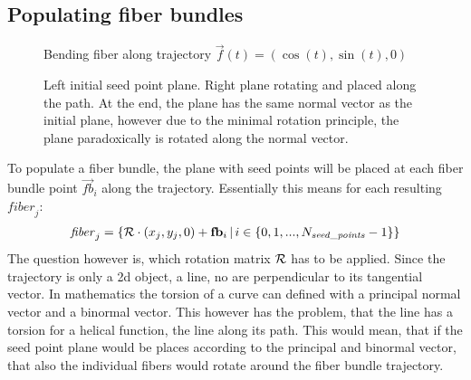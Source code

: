 \subsection{Populating fiber bundles}\label{sec:fillBundle}
%
\begin{figure}[!t]
    \centering
	\caption[Bending filled fiber bundle]{Bending fiber along trajectory $\vec{f}(t) = \left(\cos(t), \sin(t), 0 \right)$ }
	\label{fig:bendingFiberBundle}
\end{figure}
%
\begin{figure}[!t]
    \centering
    \setlength{\tikzwidth}{0.75\textwidth}
	\caption[]{Left initial seed point plane. Right plane rotating and placed along the path. At the end, the plane has the same normal vector as the initial plane, however due to the minimal rotation principle, the plane paradoxically is rotated along the normal vector.}
	\label{fig:torsion}
\end{figure}
%
To populate a fiber bundle, the plane with seed points will be placed at each fiber bundle point $\vec{fb}_i$ along the trajectory.
Essentially this means for each resulting $\mathit{fiber}_j$:
\begin{align}
    \mathit{fiber}_j = \left\{ \mathcal{R} \cdot (x_j, y_j, 0) + \mathbf{fb}_i \, | \, i \in \{0,1,...,N_{\mathit{seed\_points}}-1\}\right\}
\end{align}
The question however is, which rotation matrix $\mathcal{R}$ has to be applied.
Since the trajectory is only a 2d object, \ie{} a line, no \dummy{} are perpendicular to its tangential vector.
In mathematics the torsion of a curve can defined with a principal normal vector and a binormal vector.
This however has the problem, that the line has a torsion for a helical function, \ie{} the line  along its path.
This would mean, that if the seed point plane would be places according to the principal and binormal vector, that also the individual fibers would rotate around the fiber bundle trajectory.
